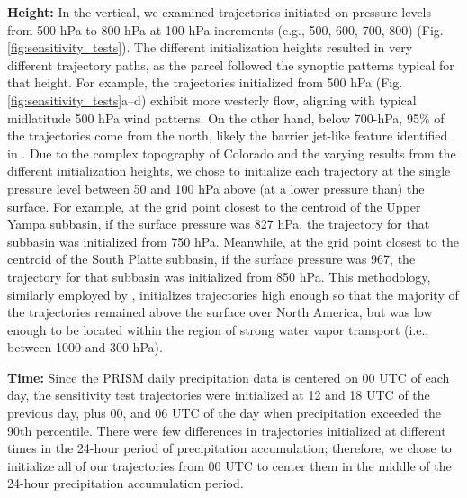 \documentclass[draft]{agujournal2019}
\begin{document}
\textbf{Height:} In the vertical, we examined trajectories initiated on pressure levels from 500 hPa to 800 hPa at 100-hPa increments (e.g., 500, 600, 700, 800) (Fig. \ref{fig:sensitivity_tests}). The different initialization heights resulted in very different trajectory paths, as the parcel followed the synoptic patterns typical for that height. For example, the trajectories initialized from 500 hPa (Fig. \ref{fig:sensitivity_tests}a--d) exhibit more westerly flow, aligning with typical midlatitude 500 hPa wind patterns. On the other hand, below 700-hPa, 95\% of the trajectories come from the north, likely the barrier jet-like feature identified in . Due to the complex topography of Colorado and the varying results from the different initialization heights, we chose to initialize each trajectory at the single pressure level between 50 and 100 hPa above (at a lower pressure than) the surface. For example, at the grid point closest to the centroid of the Upper Yampa subbasin, if the surface pressure was 827 hPa, the trajectory for that subbasin was initialized from 750 hPa. Meanwhile, at the grid point closest to the centroid of the South Platte subbasin, if the surface pressure was 967, the trajectory for that subbasin was initialized from 850 hPa. This methodology, similarly employed by , initializes trajectories high enough so that the majority of the trajectories remained above the surface over North America, but was low enough to be located within the region of strong water vapor transport (i.e., between 1000 and 300 hPa). 

\textbf{Time:} Since the PRISM daily precipitation data is centered on 00 UTC of each day, the sensitivity test trajectories were initialized at 12 and 18 UTC of the previous day, plus 00, and 06 UTC of the day when precipitation exceeded the 90th percentile. There were few differences in trajectories initialized at different times in the 24-hour period of precipitation accumulation; therefore, we chose to initialize all of our trajectories from 00 UTC to center them in the middle of the 24-hour precipitation accumulation period. 
\end{document}
